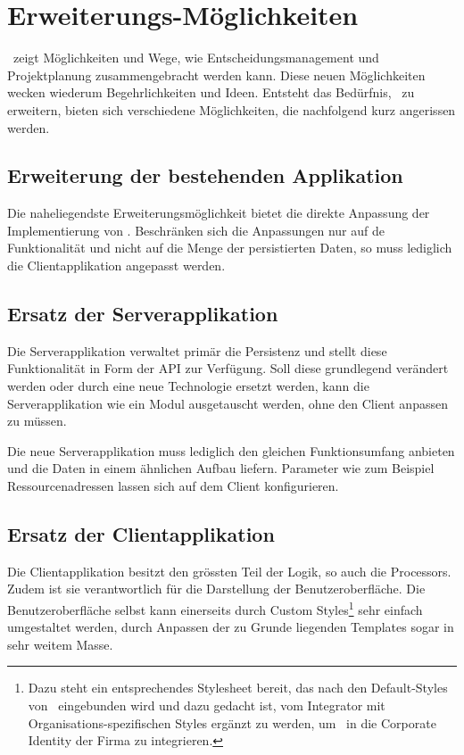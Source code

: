 	
	\section{Erweiterungs-Möglichkeiten}
		\eeppi\ zeigt Möglichkeiten und Wege, wie Entscheidungsmanagement und Projektplanung zusammengebracht werden kann.
		Diese neuen Möglichkeiten wecken wiederum Begehrlichkeiten und Ideen.
		Entsteht das Bedürfnis, \eeppi\ zu erweitern, bieten sich verschiedene Möglichkeiten, die nachfolgend kurz angerissen werden.
		

		\subsection{Erweiterung der bestehenden Applikation}
			Die naheliegendste Erweiterungsmöglichkeit bietet die direkte Anpassung der Implementierung von \eeppi.
			Beschränken sich die Anpassungen nur auf de Funktionalität und nicht auf die Menge der persistierten Daten, so muss lediglich die Clientapplikation angepasst werden.
	
		\subsection{Ersatz der Serverapplikation}
			Die Serverapplikation verwaltet primär die Persistenz und stellt diese Funktionalität in Form der API zur Verfügung.
			Soll diese grundlegend verändert werden oder durch eine neue Technologie ersetzt werden,
			kann die Serverapplikation wie ein Modul ausgetauscht werden, ohne den Client anpassen zu müssen.
			
			Die neue Serverapplikation muss lediglich den gleichen Funktionsumfang anbieten und die Daten in einem ähnlichen Aufbau liefern.
			Parameter wie zum Beispiel Ressourcenadressen lassen sich auf dem Client konfigurieren. 
	
		\subsection{Ersatz der Clientapplikation}
			Die Clientapplikation besitzt den grössten Teil der Logik, so auch die Processors.
			Zudem ist sie verantwortlich für die Darstellung der Benutzeroberfläche.
			Die Benutzeroberfläche selbst kann einerseits durch Custom Styles\footnote{Dazu steht ein entsprechendes Stylesheet bereit, das nach den Default-Styles von \eeppi\ eingebunden wird und dazu gedacht ist, vom Integrator mit Organisations-spezifischen Styles ergänzt zu werden, um \eeppi\ in die Corporate Identity der Firma zu integrieren.} sehr einfach umgestaltet werden, durch Anpassen der zu Grunde liegenden Templates sogar in sehr weitem Masse.
			
